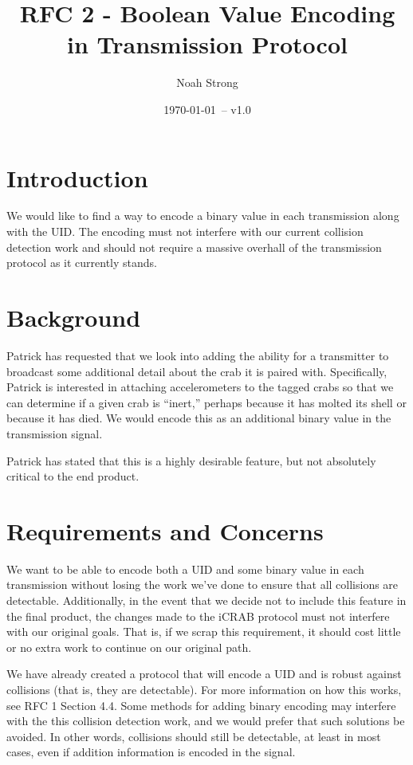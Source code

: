 \documentclass[12pt]{article}
\title{RFC 2 - Boolean Value Encoding in Transmission Protocol}
\author{
	Noah Strong
}
\date{\today\ -- v1.0}
\begin{document}
\maketitle

\tableofcontents{}

\newpage

\section{Introduction}

We would like to find a way to encode a binary value in each transmission
along with the UID.
The encoding must not interfere with our current collision detection work
and should not require a massive overhall of the transmission protocol as it
currently stands.

\section{Background}

Patrick has requested that we look into adding the ability for a transmitter to
broadcast some additional detail about the crab it is paired with.
Specifically, Patrick is interested in attaching accelerometers to the tagged
crabs so that we can determine if a given crab is ``inert,'' perhaps because it
has molted its shell or because it has died. We would encode this as an
additional binary value in the transmission signal.

Patrick has stated that this is a highly desirable feature, but not absolutely
critical to the end product.

\section{Requirements and Concerns}

We want to be able to encode both a UID and some binary value in each
transmission without losing the work we've done to ensure that all collisions
are detectable. Additionally, in the event that we decide not to include this
feature in the final product, the changes made to the iCRAB protocol must not
interfere with our original goals. That is, if we scrap this requirement, it
should cost little or no extra work to continue on our original path.

We have already created a protocol that will encode a UID and is robust against
collisions (that is, they are detectable).
For more information on how this works, see RFC 1 Section 4.4.
Some methods for adding binary encoding may interfere with the this collision
detection work, and we would prefer that such solutions be avoided.
In other words, collisions should still be detectable, at least in most cases,
even if addition information is encoded in the signal.
\end{document}
